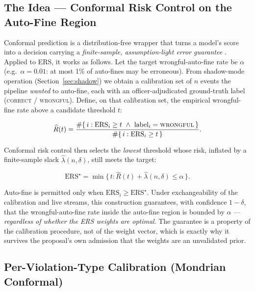 \documentclass[11pt,a4paper]{article}
\begin{document}
\subsection*{The Idea — Conformal Risk Control on the Auto-Fine Region}

Conformal prediction is a distribution-free wrapper that turns a model's score into a decision carrying a \emph{finite-sample, assumption-light error guarantee} \cite{angelopoulos2023conformal, vovk2005alrw}. Applied to ERS, it works as follows. Let the target wrongful-auto-fine rate be $\alpha$ (e.g.\ $\alpha = 0.01$: at most 1\% of auto-fines may be erroneous). From shadow-mode operation (Section~\ref{sec:shadow}) we obtain a calibration set of $n$ events the pipeline \emph{wanted} to auto-fine, each with an officer-adjudicated ground-truth label (\textsc{correct} / \textsc{wrongful}). Define, on that calibration set, the empirical wrongful-fine rate above a candidate threshold $t$:

\begin{equation}
\widehat{R}(t) = \frac{\#\{\, i : \text{ERS}_i \ge t \ \wedge\ \text{label}_i = \textsc{wrongful} \,\}}{\#\{\, i : \text{ERS}_i \ge t \,\}}.
\end{equation}

Conformal risk control \cite{angelopoulos2024crc} then selects the \emph{lowest} threshold whose risk, inflated by a finite-sample slack $\hat{\lambda}(n,\delta)$, still meets the target:

\begin{equation}
\text{ERS}^{\star} = \min\big\{\, t : \widehat{R}(t) + \hat{\lambda}(n,\delta) \le \alpha \,\big\}.
\end{equation}

Auto-fine is permitted only when $\text{ERS}_i \ge \text{ERS}^{\star}$. Under exchangeability of the calibration and live streams, this construction guarantees, with confidence $1-\delta$, that the wrongful-auto-fine rate inside the auto-fine region is bounded by $\alpha$ --- \emph{regardless of whether the ERS weights are optimal}. The guarantee is a property of the calibration procedure, not of the weight vector, which is exactly why it survives the proposal's own admission that the weights are an unvalidated prior.

\subsection*{Per-Violation-Type Calibration (Mondrian Conformal)}
\end{document}
